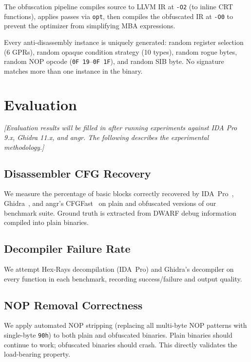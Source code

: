 \documentclass[letterpaper,twocolumn,10pt]{article}
\begin{document}
The obfuscation pipeline compiles source to LLVM IR at \texttt{-O2} (to inline CRT functions), applies passes via \texttt{opt}, then compiles the obfuscated IR at \texttt{-O0} to prevent the optimizer from simplifying MBA expressions.

Every anti-disassembly instance is uniquely generated: random register selection (6 GPRs), random opaque condition strategy (10 types), random rogue bytes, random NOP opcode (\texttt{0F~19}--\texttt{0F~1F}), and random SIB byte. No signature matches more than one instance in the binary.

\section{Evaluation}
\label{sec:eval}

\textit{[Evaluation results will be filled in after running experiments against IDA Pro 9.x, Ghidra 11.x, and angr. The following describes the experimental methodology.]}

\subsection{Disassembler CFG Recovery}

We measure the percentage of basic blocks correctly recovered by IDA~Pro~\cite{idapro}, Ghidra~\cite{ghidra}, and angr's CFGFast~\cite{angr} on plain and obfuscated versions of our benchmark suite. Ground truth is extracted from DWARF debug information compiled into plain binaries.

\subsection{Decompiler Failure Rate}

We attempt Hex-Rays decompilation (IDA~Pro) and Ghidra's decompiler on every function in each benchmark, recording success/failure and output quality.

\subsection{NOP Removal Correctness}

We apply automated NOP stripping (replacing all multi-byte NOP patterns with single-byte \texttt{90h}) to both plain and obfuscated binaries. Plain binaries should continue to work; obfuscated binaries should crash. This directly validates the load-bearing property.
\end{document}
